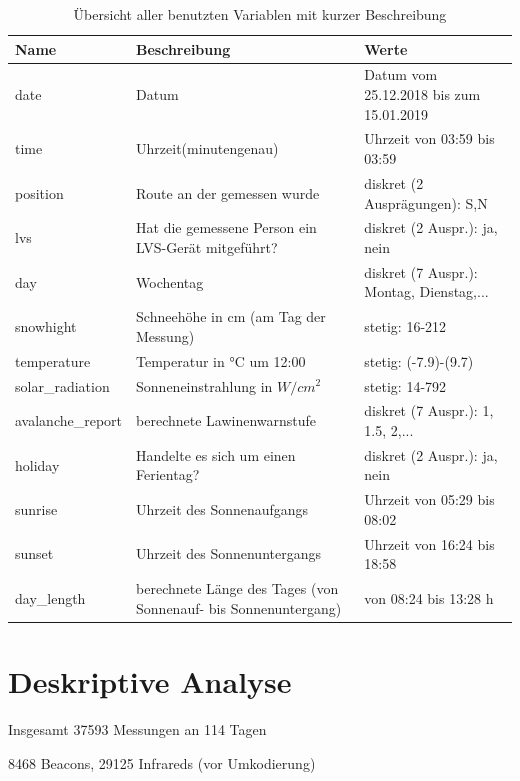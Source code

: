 \documentclass[12pt]{scrreprt}
\begin{document}
	
	\begin{table}
		\centering
		\caption{Übersicht aller benutzten Variablen mit kurzer Beschreibung}
		\begin{adjustbox}{max width=\textwidth}
		\begin{tabular}{l|l|l}
			\textbf{Name} & \textbf{Beschreibung} & \textbf{Werte} \\
			\hline
			\hline
			date & Datum & Datum vom 25.12.2018 bis zum 15.01.2019 \\
			\hline
			time & Uhrzeit(minutengenau) & Uhrzeit von 03:59 bis 03:59 \\
			\hline
			position & Route an der gemessen wurde & diskret (2 Ausprägungen): S,N \\
			\hline
			lvs & Hat die gemessene Person ein LVS-Gerät mitgeführt? & diskret (2 Auspr.): ja, nein \\
			\hline
			day & Wochentag & diskret (7 Auspr.): Montag, Dienstag,... \\
			\hline
			snowhight & Schneehöhe in cm (am Tag der Messung) & stetig: 16-212 \\
			\hline
			temperature & Temperatur in °C um 12:00 & stetig: (-7.9)-(9.7) \\
			\hline
			solar\_radiation & Sonneneinstrahlung in $W/cm^2$ & stetig: 14-792 \\
			\hline
			avalanche\_report & berechnete Lawinenwarnstufe & diskret (7 Auspr.): 1, 1.5, 2,... \\
			\hline
			holiday & Handelte es sich um einen Ferientag? & diskret (2 Auspr.): ja, nein \\
			\hline
			sunrise & Uhrzeit des Sonnenaufgangs & Uhrzeit von 05:29 bis 08:02 \\
			\hline
			sunset & Uhrzeit des Sonnenuntergangs & Uhrzeit von 16:24 bis 18:58 \\
			\hline
			day\_length & berechnete Länge des Tages (von Sonnenauf- bis Sonnenuntergang) & von 08:24 bis 13:28 h \\
			\hline
		\end{tabular}
		\end{adjustbox}
		\label{tab:var}
		\end{table}
	
	\chapter{Deskriptive Analyse}
	Insgesamt 37593 Messungen an 114 Tagen
	
	8468 Beacons, 29125 Infrareds (vor Umkodierung)
	
\end{document}
